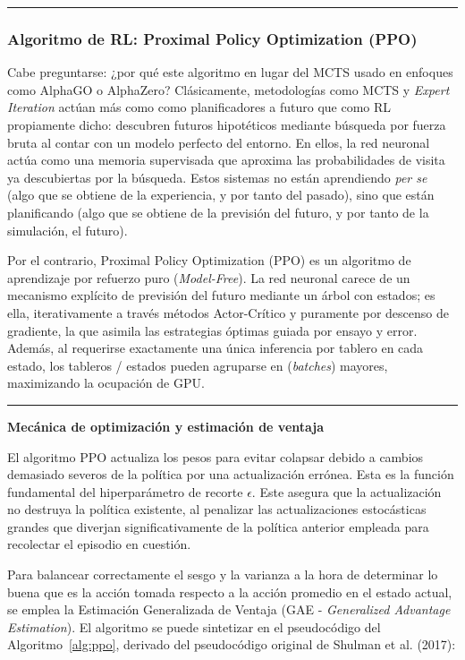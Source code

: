 \documentclass[12pt, a4paper]{article}
\let\cite\supercite
\newcommand{\placeholderfig}[3]{
    \begin{figure}[htbp]
        \centering
        \setlength{\fboxsep}{0pt}
        \fbox{
            \begin{minipage}[c][7cm][c]{0.8\textwidth}
                \centering \textit{#1}
            \end{minipage}
        }
        \caption{#2}
        \label{#3}
    \end{figure}
}
\begin{document}

\rule{\textwidth}{0.2pt}
\subsubsection{Algoritmo de RL: Proximal Policy Optimization (PPO)}

Cabe preguntarse: ¿por qué este algoritmo en lugar del MCTS usado en enfoques como AlphaGO o AlphaZero? Clásicamente, metodologías como MCTS y \textit{Expert Iteration} actúan más como como planificadores a futuro que como RL propiamente dicho: descubren futuros hipotéticos mediante búsqueda por fuerza bruta al contar con un modelo perfecto del entorno. En ellos, la red neuronal actúa como una memoria supervisada que aproxima las probabilidades de visita ya descubiertas por la búsqueda. 
Estos sistemas no están aprendiendo \textit{per se} (algo que se obtiene de la experiencia, y por tanto del pasado), sino que están planificando (algo que se obtiene de la previsión del futuro, y por tanto de la simulación, el futuro). 

Por el contrario, Proximal Policy Optimization (PPO) es un algoritmo de aprendizaje por refuerzo puro (\textit{Model-Free}). La red neuronal carece de un mecanismo explícito de previsión del futuro mediante un árbol con estados; es ella, iterativamente a través métodos Actor-Crítico y puramente por descenso de gradiente, la que asimila las estrategias óptimas guiada por ensayo y error. Además, al requerirse exactamente una única inferencia por tablero en cada estado, los tableros / estados pueden agruparse en (\textit{batches}) mayores, maximizando la ocupación de GPU.

\rule{\textwidth}{0.2pt}
\textbf{Mecánica de optimización y estimación de ventaja}

El algoritmo PPO actualiza los pesos para evitar colapsar debido a cambios demasiado severos de la política por una actualización errónea. Esta es la función fundamental del hiperparámetro de recorte $\epsilon$. Este asegura que la actualización no destruya la política existente, al penalizar las actualizaciones estocásticas grandes que diverjan significativamente de la política anterior empleada para recolectar el episodio en cuestión.

Para balancear correctamente el sesgo y la varianza a la hora de determinar lo buena que es la acción tomada respecto a la acción promedio en el estado actual, se emplea la Estimación Generalizada de Ventaja (GAE - \textit{Generalized Advantage Estimation}). El algoritmo se puede sintetizar en el pseudocódigo del Algoritmo~\ref{alg:ppo}, derivado del pseudocódigo original de Shulman et al. (2017)\cite{DBLP:journals/corr/SchulmanWDRK17}:
\end{document}

